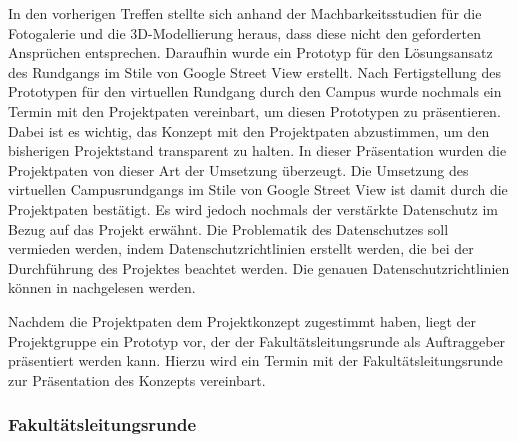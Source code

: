 In den vorherigen Treffen stellte sich anhand der Machbarkeitsstudien für die
Fotogalerie und die 3D-Modellierung heraus, dass diese nicht den geforderten
Ansprüchen entsprechen. Daraufhin wurde ein Prototyp für den Lösungsansatz des
Rundgangs im Stile von Google Street View erstellt. Nach Fertigstellung des
Prototypen für den virtuellen Rundgang durch den Campus wurde nochmals ein
Termin mit den Projektpaten vereinbart, um diesen Prototypen zu präsentieren.
Dabei ist es wichtig, das Konzept mit den Projektpaten abzustimmen, um den bisherigen Projektstand transparent zu halten. In dieser Präsentation wurden die Projektpaten von dieser Art der Umsetzung überzeugt. Die Umsetzung des
virtuellen Campusrundgangs im Stile von Google Street View ist damit durch die Projektpaten bestätigt. Es wird jedoch nochmals der verstärkte Datenschutz im Bezug auf das Projekt 
erwähnt. Die Problematik des Datenschutzes soll vermieden werden, indem Datenschutzrichtlinien erstellt werden, die bei 
der Durchführung des Projektes beachtet werden. Die genauen
Datenschutzrichtlinien können in  nachgelesen
werden.

\clearpage

Nachdem die Projektpaten dem Projektkonzept zugestimmt haben, liegt der Projektgruppe ein Prototyp vor, der der 
Fakultätsleitungsrunde als Auftraggeber präsentiert werden kann.
Hierzu wird ein Termin mit der Fakultätsleitungsrunde zur Präsentation des Konzepts vereinbart.


\subsubsection*{Fakultätsleitungsrunde}
\label{sec:Treffen4}

